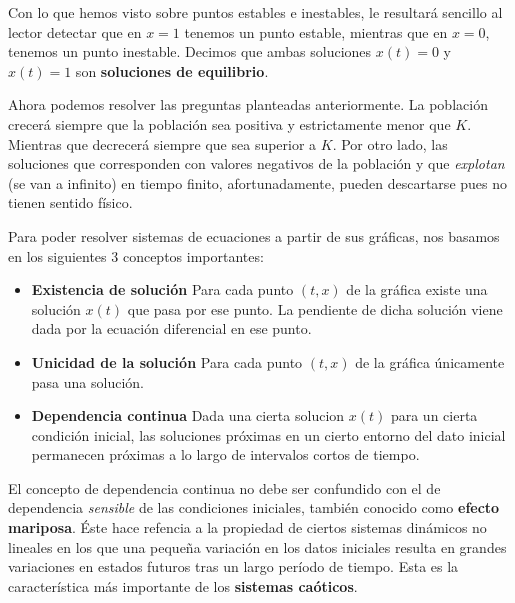 Con lo que hemos visto sobre puntos estables e inestables, le resultará sencillo al lector detectar que en $x=1$ tenemos un punto estable, mientras que en $x=0$, tenemos un punto inestable. Decimos que ambas soluciones $x(t) = 0$ y $x(t) = 1$ son \textbf{soluciones de equilibrio}.

Ahora podemos resolver las preguntas planteadas anteriormente. La población crecerá siempre que la población sea positiva y estrictamente menor que $K$. Mientras que decrecerá siempre que sea superior a $K$. Por otro lado, las soluciones que corresponden con valores negativos de la población y que \emph{explotan} (se van a infinito) en tiempo finito, afortunadamente, pueden descartarse pues no tienen sentido físico.\newline

Para poder resolver sistemas de ecuaciones a partir de sus gráficas, nos basamos en los siguientes 3 conceptos importantes:

\begin{itemize}
\item \textbf{Existencia de solución} Para cada punto $(t,x)$ de la gráfica existe una  solución $x(t)$ que pasa por ese punto. La pendiente de dicha solución viene dada por la ecuación diferencial en ese punto.
\item \textbf{Unicidad de la solución} Para cada punto $(t,x)$ de la gráfica únicamente pasa una solución.
\item \textbf{Dependencia continua} Dada una cierta solucion $x(t)$ para un cierta condición inicial, las soluciones próximas en un cierto entorno del dato inicial permanecen próximas a lo largo de intervalos cortos de tiempo.
\end{itemize}

El concepto de dependencia continua no debe ser confundido con el de dependencia \emph{sensible} de las condiciones iniciales, también conocido como \textbf{efecto mariposa}. Éste hace refencia a la propiedad de ciertos sistemas dinámicos no lineales en los que una pequeña variación en los datos iniciales resulta en grandes variaciones en estados futuros tras un largo período de tiempo. Esta es la característica más importante de los \textbf{sistemas caóticos}.

%
%
%
%

